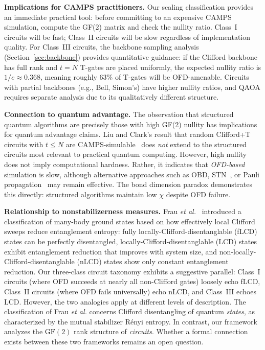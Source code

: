 \documentclass[a4paper,twocolumn,11pt]{quantumarticle}
\begin{document}
\textbf{Implications for CAMPS practitioners.}
Our scaling classification provides an immediate practical tool: before committing to an expensive CAMPS simulation, compute the GF(2) matrix and check the nullity ratio.
Class~I circuits will be fast; Class~II circuits will be slow regardless of implementation quality.
For Class~III circuits, the backbone sampling analysis (Section~\ref{sec:backbone}) provides quantitative guidance: if the Clifford backbone has full rank and $t = N$ T-gates are placed uniformly, the expected nullity ratio is $1/e \approx 0.368$, meaning roughly $63\%$ of T-gates will be OFD-amenable.
Circuits with partial backbones (e.g., Bell, Simon's) have higher nullity ratios, and QAOA requires separate analysis due to its qualitatively different structure.

\textbf{Connection to quantum advantage.}
The observation that structured quantum algorithms are precisely those with high GF(2) nullity has implications for quantum advantage claims.
Liu and Clark's result that random Clifford+T circuits with $t \le N$ are CAMPS-simulable~\cite{Liu2024} does \emph{not} extend to the structured circuits most relevant to practical quantum computing.
However, high nullity does not imply computational hardness. Rather, it indicates that \emph{OFD-based} simulation is slow, although alternative approaches such as OBD, STN~\cite{MasotLlima2024}, or Pauli propagation~\cite{PauliProp2019} may remain effective.
The bond dimension paradox demonstrates this directly: structured algorithms maintain low $\chi$ despite OFD failure.

\textbf{Relationship to nonstabilizerness measures.}
Frau \emph{et al.}~\cite{Frau2025} introduced a classification of many-body ground states based on how effectively local Clifford sweeps reduce entanglement entropy: fully locally-Clifford-disentanglable (fLCD) states can be perfectly disentangled, locally-Clifford-disentanglable (LCD) states exhibit entanglement reduction that improves with system size, and non-locally-Clifford-disentanglable (nLCD) states show only constant entanglement reduction.
Our three-class circuit taxonomy exhibits a suggestive parallel: Class~I circuits (where OFD succeeds at nearly all non-Clifford gates) loosely echo fLCD, Class~II circuits (where OFD fails universally) echo nLCD, and Class~III echoes LCD.
However, the two analogies apply at different levels of description. The classification of Frau \emph{et al.} concerns Clifford disentangling of quantum \emph{states}, as characterized by the mutual stabilizer R\'{e}nyi entropy. In contrast, our framework analyzes the $\mathrm{GF}(2)$ rank structure of \emph{circuits}.
Whether a formal connection exists between these two frameworks remains an open question.
\end{document}
